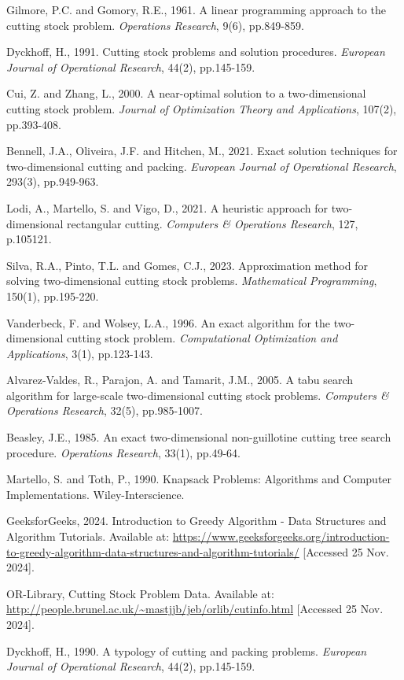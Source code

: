 \documentclass[a4paper]{article}
\begin{document}
\pagebreak

\pagebreak
\nocite{*}
\printbibliography[
heading=bibintoc,
title={References}
]
\begin{thebibliography}{9}

Gilmore, P.C. and Gomory, R.E., 1961. A linear programming approach to the cutting stock problem. \textit{Operations Research}, 9(6), pp.849-859.

Dyckhoff, H., 1991. Cutting stock problems and solution procedures. \textit{European Journal of Operational Research}, 44(2), pp.145-159.

Cui, Z. and Zhang, L., 2000. A near-optimal solution to a two-dimensional cutting stock problem. \textit{Journal of Optimization Theory and Applications}, 107(2), pp.393-408.

Bennell, J.A., Oliveira, J.F. and Hitchen, M., 2021. Exact solution techniques for two-dimensional cutting and packing. \textit{European Journal of Operational Research}, 293(3), pp.949-963.

Lodi, A., Martello, S. and Vigo, D., 2021. A heuristic approach for two-dimensional rectangular cutting. \textit{Computers \& Operations Research}, 127, p.105121.

Silva, R.A., Pinto, T.L. and Gomes, C.J., 2023. Approximation method for solving two-dimensional cutting stock problems. \textit{Mathematical Programming}, 150(1), pp.195-220.

Vanderbeck, F. and Wolsey, L.A., 1996. An exact algorithm for the two-dimensional cutting stock problem. \textit{Computational Optimization and Applications}, 3(1), pp.123-143.

Alvarez-Valdes, R., Parajon, A. and Tamarit, J.M., 2005. A tabu search algorithm for large-scale two-dimensional cutting stock problems. \textit{Computers \& Operations Research}, 32(5), pp.985-1007.

Beasley, J.E., 1985. An exact two-dimensional non-guillotine cutting tree search procedure. \textit{Operations Research}, 33(1), pp.49-64.

Martello, S. and Toth, P., 1990. Knapsack Problems: Algorithms and Computer Implementations. Wiley-Interscience.

GeeksforGeeks, 2024. Introduction to Greedy Algorithm - Data Structures and Algorithm Tutorials. Available at: \url{https://www.geeksforgeeks.org/introduction-to-greedy-algorithm-data-structures-and-algorithm-tutorials/} [Accessed 25 Nov. 2024].

OR-Library, Cutting Stock Problem Data. Available at: \url{http://people.brunel.ac.uk/~mastjjb/jeb/orlib/cutinfo.html} [Accessed 25 Nov. 2024].

Dyckhoff, H., 1990. A typology of cutting and packing problems. \textit{European Journal of Operational Research}, 44(2), pp.145-159.

\end{thebibliography}
\end{document}
